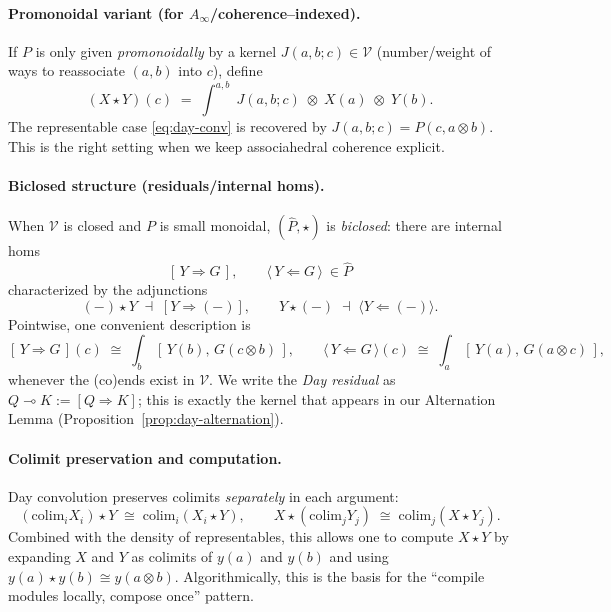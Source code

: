 \documentclass[11pt]{article}
\numberwithin{equation}{section}
\theoremstyle{upright}
\newcommand{\V}{\mathcal{V}}
\begin{document}
\paragraph{Promonoidal variant (for $A_\infty$/coherence–indexed).}
If $P$ is only given \emph{promonoidally} by a kernel
$J(a,b;c)\in\V$ (number/weight of ways to reassociate $(a,b)$ into $c$),
define
\begin{equation}\label{eq:day-promonoidal}
(X\star Y)(c)\;=\;\int^{a,b} \;J(a,b;c)\;\otimes\; X(a)\;\otimes\; Y(b).
\end{equation}
The representable case \eqref{eq:day-conv} is recovered by
$J(a,b;c)=P(c,a\otimes b)$. This is the right setting when we keep
associahedral coherence explicit.

\paragraph{Biclosed structure (residuals/internal homs).}
When $\V$ is closed and $P$ is small monoidal, $(\widehat P,\star)$
is \emph{biclosed}: there are internal homs
\[
[\,Y\Rightarrow G\,],\qquad \langle\,Y\Leftarrow G\,\rangle \ \in \widehat P
\]
characterized by the adjunctions
\[
(-)\star Y \;\dashv\; [Y\Rightarrow(-)],
\qquad
Y\star(-) \;\dashv\; \langle Y\Leftarrow(-)\rangle.
\]
Pointwise, one convenient description is
\begin{equation}\label{eq:day-internal-homs}
[\,Y\Rightarrow G\,](c)\;\cong\;\int_{b}\,[\,Y(b),\,G(c\otimes b)\,],
\qquad
\langle\,Y\Leftarrow G\,\rangle(c)\;\cong\;\int_{a}\,[\,Y(a),\,G(a\otimes c)\,],
\end{equation}
whenever the (co)ends exist in $\V$.
We write the \emph{Day residual} as $Q\multimap K:=[Q\Rightarrow K]$;
this is exactly the kernel that appears in our Alternation Lemma
(Proposition~\ref{prop:day-alternation}).

\paragraph{Colimit preservation and computation.}
Day convolution preserves colimits \emph{separately} in each argument:
\[
(\mathrm{colim}_i X_i)\star Y \;\cong\; \mathrm{colim}_i (X_i\star Y),
\qquad
X\star (\mathrm{colim}_j Y_j) \;\cong\; \mathrm{colim}_j (X\star Y_j).
\]
Combined with the density of representables, this allows one to compute
$X\star Y$ by expanding $X$ and $Y$ as colimits of $y(a)$ and $y(b)$ and
using $y(a)\star y(b)\cong y(a\otimes b)$. Algorithmically, this is the
basis for the “compile modules locally, compose once” pattern.
\end{document}
